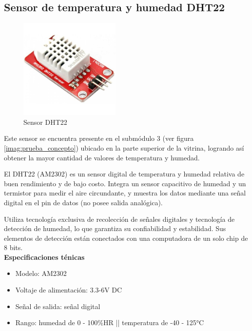 \subsection{Sensor de temperatura y humedad DHT22}\label{sub:dht22}

    \begin{figure}[H]
      \centering
      \includegraphics[width=5cm, height=5cm]{imagenes/dht22.jpg}
      \caption{Sensor DHT22}
      \label{imag:dht22}
    \end{figure}

Este sensor se encuentra presente en el submódulo 3 (ver figura \ref{imag:prueba_concepto}) ubicado en la parte superior de la vitrina,
logrando así obtener la mayor cantidad de valores de temperatura y humedad.
   
El DHT22 (AM2302) es un sensor digital de temperatura y humedad relativa de buen rendimiento y de bajo costo. Integra un sensor capacitivo de humedad y un termistor para medir el aire circundante, y muestra los datos mediante una señal digital en el pin de datos (no posee salida analógica).

Utiliza tecnología exclusiva de recolección de señales digitales y tecnología de detección de humedad, lo que garantiza su confiabilidad y estabilidad. Sus elementos de detección están conectados con una computadora de un solo chip de 8 bits.\\

\textbf{Especificaciones ténicas}

\begin{itemize}
    \item Modelo: AM2302
    \item Voltaje de alimentación: 3.3-6V DC
    \item Señal de salida: señal digital
    \item Rango: humedad de 0 - 100\%HR || temperatura de -40 - 125°C
\end{itemize}

